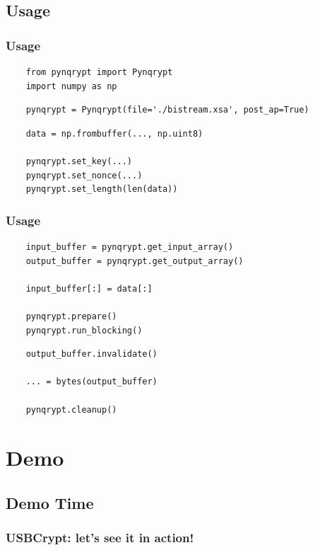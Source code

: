 \documentclass{beamer}
\begin{document}
\subsection{Usage}
\begin{frame}[fragile]
    \frametitle{Usage}

    \begin{lstlisting}
    from pynqrypt import Pynqrypt
    import numpy as np
    \end{lstlisting}

    \begin{lstlisting}
    pynqrypt = Pynqrypt(file='./bistream.xsa', post_ap=True)
    \end{lstlisting}

    \begin{lstlisting}
    data = np.frombuffer(..., np.uint8)

    pynqrypt.set_key(...)
    pynqrypt.set_nonce(...)
    pynqrypt.set_length(len(data))
    \end{lstlisting}
\end{frame}

\begin{frame}[fragile]
    \frametitle{Usage}

    \begin{lstlisting}
    input_buffer = pynqrypt.get_input_array()
    output_buffer = pynqrypt.get_output_array()

    input_buffer[:] = data[:]

    pynqrypt.prepare()
    pynqrypt.run_blocking()
    \end{lstlisting}

    \begin{lstlisting}
    output_buffer.invalidate()

    ... = bytes(output_buffer)

    pynqrypt.cleanup()
    \end{lstlisting}
\end{frame}

\section{Demo}

\subsection{Demo Time}
\begin{frame}
    \frametitle{USBCrypt: let's see it in action!}
\end{frame}
\end{document}

